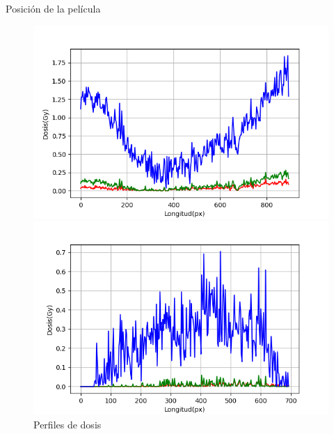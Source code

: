 \documentclass[12pt]{beamer}
\begin{document}
\begin{frame}{Posición de la película}
\begin{figure}[htp]
\begin{minipage}{0.45\textwidth}
		\includegraphics[width=\textwidth]{images/perfilDosisCeroHorizontal.png}
	\end{minipage}\hfill
	\begin{minipage}{0.45\textwidth}
		\includegraphics[width=\textwidth]{images/perfilDosisCeroVerticalEnCentro.png}
	\end{minipage}
	\caption{Perfiles de dosis}
\end{figure}
\end{frame}
\end{document}
